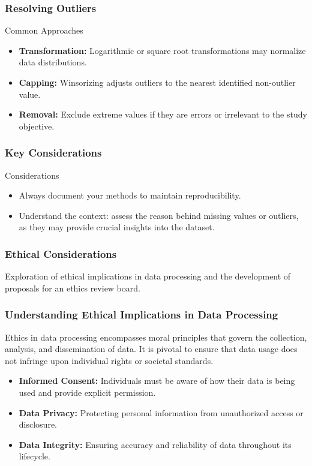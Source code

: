 \documentclass{beamer}
\begin{document}
\begin{frame}
    \frametitle{Resolving Outliers}
    \begin{block}{Common Approaches}
        \begin{itemize}
            \item \textbf{Transformation:} Logarithmic or square root transformations may normalize data distributions.
            \item \textbf{Capping:} Winsorizing adjusts outliers to the nearest identified non-outlier value.
            \item \textbf{Removal:} Exclude extreme values if they are errors or irrelevant to the study objective.
        \end{itemize}
    \end{block}
\end{frame}

\begin{frame}
    \frametitle{Key Considerations}
    \begin{block}{Considerations}
        \begin{itemize}
            \item Always document your methods to maintain reproducibility.
            \item Understand the context: assess the reason behind missing values or outliers, as they may provide crucial insights into the dataset.
        \end{itemize}
    \end{block}
\end{frame}

\begin{frame}[fragile]
    \frametitle{Ethical Considerations}
    Exploration of ethical implications in data processing and the development of proposals for an ethics review board.
\end{frame}

\begin{frame}[fragile]
    \frametitle{Understanding Ethical Implications in Data Processing}
    Ethics in data processing encompasses moral principles that govern the collection, analysis, and dissemination of data. It is pivotal to ensure that data usage does not infringe upon individual rights or societal standards.

    \begin{itemize}
        \item \textbf{Informed Consent:} Individuals must be aware of how their data is being used and provide explicit permission.
        \item \textbf{Data Privacy:} Protecting personal information from unauthorized access or disclosure.
        \item \textbf{Data Integrity:} Ensuring accuracy and reliability of data throughout its lifecycle.
    \end{itemize}
\end{frame}
\end{document}
